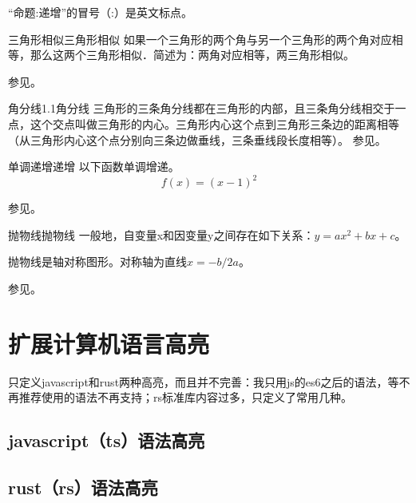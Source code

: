 \documentclass{ctexart}
\begin{document}
\begin{注意}
    “命题:递增”的冒号（:）是英文标点。
\end{注意}

\begin{定理}{三角形相似}{三角形相似}
    如果一个三角形的两个角与另一个三角形的两个角对应相等，那么这两个三角形相似．简述为：两角对应相等，两三角形相似。

    参见。
\end{定理}

\begin{结论}{角分线1.1}{角分线}
    三角形的三条角分线都在三角形的内部，且三条角分线相交于一点，这个交点叫做三角形的内心。三角形内心这个点到三角形三条边的距离相等（从三角形内心这个点分别向三条边做垂线，三条垂线段长度相等）。
    参见。
\end{结论}

\begin{命题}{单调递增}{递增}
以下函数单调增递。
\[
    f(x) = (x - 1) ^ 2
\]

参见。
\end{命题}

\begin{定义}{抛物线}{抛物线}
    一般地，自变量x和因变量y之间存在如下关系：$y=ax^2+bx+c$。

    抛物线是轴对称图形。对称轴为直线$x=-b/2a$。

    参见。
\end{定义}

\section{扩展计算机语言高亮}
只定义javascript和rust两种高亮，而且并不完善：我只用js的es6之后的语法，等不再推荐使用的语法不再支持；rs标准库内容过多，只定义了常用几种。

\subsection{javascript（ts）语法高亮}


\subsection{rust（rs）语法高亮}

\end{document}
